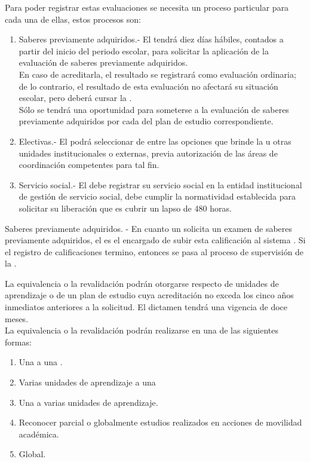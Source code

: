\begin{PDescripcion}
\begin{enumerate}
		\Ppaso[\PSubProceso]  Para poder registrar estas evaluaciones se necesita un proceso particular para cada una de ellas, estos procesos son:
		\begin{enumerate}
			\item Saberes previamente adquiridos.- El  tendrá diez días hábiles, contados a partir del inicio del periodo escolar, para solicitar la aplicación de la evaluación de saberes previamente adquiridos.\\
			En caso de acreditarla, el resultado se registrará como	evaluación ordinaria; de lo contrario, el resultado de esta evaluación no afectará su situación escolar, pero deberá cursar la .\\
			Sólo se tendrá una oportunidad para someterse a la evaluación de saberes previamente adquiridos por cada  del plan de estudio correspondiente.
			\item Electivas.- El  podrá seleccionar de entre las opciones que brinde la  u otras unidades institucionales o externas, previa autorización de las áreas de coordinación competentes para tal fin.
			\item Servicio social.- El  debe registrar su servicio social en la entidad institucional de gestión de servicio social, debe cumplir la normatividad establecida para solicitar su liberación que es cubrir un lapso de 480 horas.
		\end{enumerate}
		Saberes previamente adquiridos. - En cuanto un  solicita un examen de saberes previamente adquiridos, el  es el encargado de subir esta calificación al sistema .
		Si el registro de calificaciones termino, entonces se pasa al proceso de supervisión de la .
		
		\Ppaso[\PSubProceso]  La equivalencia o la revalidación podrán otorgarse respecto de unidades de aprendizaje o de un	plan de estudio cuya acreditación no exceda los cinco años inmediatos anteriores a la solicitud. El dictamen tendrá una vigencia de doce meses.\\
		La equivalencia o la revalidación podrán realizarse en una de las siguientes formas:
		\begin{enumerate}
			\item Una  a una .
			\item Varias unidades de aprendizaje a una 
			\item Una  a varias unidades de aprendizaje.
			\item Reconocer parcial o globalmente estudios realizados en acciones de movilidad académica.
			\item Global.
		\end{enumerate}
		

\end{enumerate}
\end{PDescripcion}
